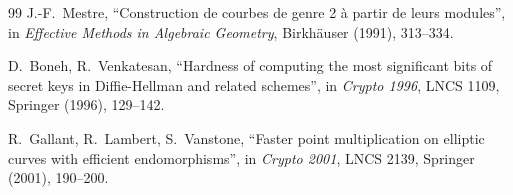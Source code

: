 \documentclass[11pt,a4paper]{article}
\theoremstyle{definition}
\begin{document}
\begin{thebibliography}{99}
 J.-F.~Mestre, ``Construction de courbes de
genre 2 à partir de leurs modules'', in \emph{Effective Methods in
Algebraic Geometry}, Birkhäuser (1991), 313--334.

 D.~Boneh, R.~Venkatesan, ``Hardness of computing
the most significant bits of secret keys in Diffie-Hellman and
related schemes'', in \emph{Crypto 1996}, LNCS 1109, Springer
(1996), 129--142.

 R.~Gallant, R.~Lambert, S.~Vanstone, ``Faster
point multiplication on elliptic curves with efficient
endomorphisms'', in \emph{Crypto 2001}, LNCS 2139, Springer (2001),
190--200.

\end{thebibliography}
\end{document}
